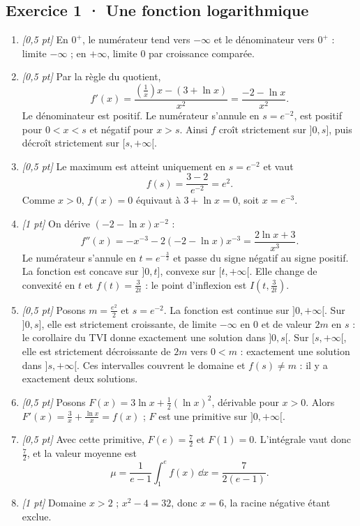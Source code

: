 \subsection*{Exercice 1 · Une fonction logarithmique}\begin{enumerate}

\item \textit{[0,5 pt]} En $0^+$, le numérateur tend vers $-\infty$ et le dénominateur vers $0^+$ : limite $-\infty$ ; en $+\infty$, limite $0$ par croissance comparée.

\item \textit{[0,5 pt]} Par la règle du quotient,
\[f'(x)=\frac{(\frac{1}{x})x-(3+\ln x)}{x^2}=\frac{-2-\ln x}{x^2}.\]
Le dénominateur est positif. Le numérateur s'annule en $s=e^{-2}$, est positif pour $0<x<s$ et négatif pour $x>s$. Ainsi $f$ croît strictement sur $]0,s]$, puis décroît strictement sur $[s,+\infty[$.

\item \textit{[0,5 pt]} Le maximum est atteint uniquement en $s=e^{-2}$ et vaut
\[f(s)=\frac{3- 2}{e^{-2}}=e^{2}.\]
Comme $x>0$, $f(x)=0$ équivaut à $3+\ln x=0$, soit $x=e^{-3}$.

\item \textit{[1 pt]} On dérive $(-2-\ln x)x^{-2}$ :
\[f''(x)=-x^{-3}-2(-2-\ln x)x^{-3}=\frac{2\ln x+3}{x^3}.\]
Le numérateur s'annule en $t=e^{-\frac{3}{2}}$ et passe du signe négatif au signe positif. La fonction est concave sur $]0,t]$, convexe sur $[t,+\infty[$. Elle change de convexité en $t$ et $f(t)=\frac{3}{2t}$ : le point d'inflexion est $I(t,\frac{3}{2t})$.

\item \textit{[0,5 pt]} Posons $m=\frac{e^{2}}{2}$ et $s=e^{-2}$. La fonction est continue sur $]0,+\infty[$. Sur $]0,s]$, elle est strictement croissante, de limite $-\infty$ en $0$ et de valeur $2m$ en $s$ : le corollaire du TVI donne exactement une solution dans $]0,s[$. Sur $[s,+\infty[$, elle est strictement décroissante de $2m$ vers $0<m$ : exactement une solution dans $]s,+\infty[$. Ces intervalles couvrent le domaine et $f(s)\ne m$ : il y a exactement deux solutions.

\item \textit{[0,5 pt]} Posons $F(x)=3\ln x+\frac12(\ln x)^2$, dérivable pour $x>0$. Alors $F'(x)=\frac{3}{x}+\frac{\ln x}{x}=f(x)$ ; $F$ est une primitive sur $]0,+\infty[$.

\item \textit{[0,5 pt]} Avec cette primitive, $F(e)=\frac{7}{2}$ et $F(1)=0$. L'intégrale vaut donc $\frac{7}{2}$, et la valeur moyenne est
\[\mu=\frac{1}{e-1}\int_1^e f(x)\,\dd x=\frac{7}{2(e-1)}.\]

\item \textit{[1 pt]} Domaine $x>2$ ; $x^2-4=32$, donc $x=6$, la racine négative étant exclue.

\end{enumerate}

